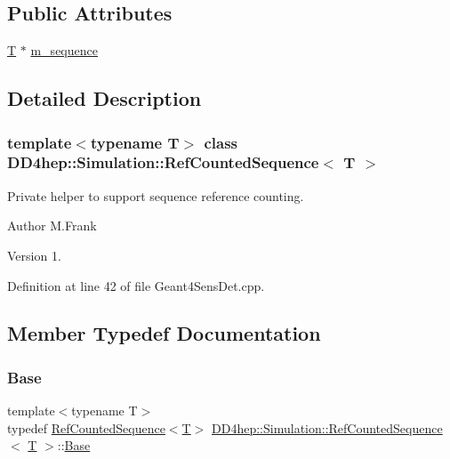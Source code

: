 \subsection*{Public Attributes}
\begin{DoxyCompactItemize}
\item 
\hyperlink{class_t}{T} $\ast$ \hyperlink{class_d_d4hep_1_1_simulation_1_1_ref_counted_sequence_a8fb29db1af39af7f025ed8d1b20b6dfe}{m\+\_\+sequence}
\end{DoxyCompactItemize}


\subsection{Detailed Description}
\subsubsection*{template$<$typename T$>$\newline
class D\+D4hep\+::\+Simulation\+::\+Ref\+Counted\+Sequence$<$ T $>$}

Private helper to support sequence reference counting. 

\begin{DoxyAuthor}{Author}
M.\+Frank 
\end{DoxyAuthor}
\begin{DoxyVersion}{Version}
1. 
\end{DoxyVersion}


Definition at line 42 of file Geant4\+Sens\+Det.\+cpp.



\subsection{Member Typedef Documentation}
\hypertarget{class_d_d4hep_1_1_simulation_1_1_ref_counted_sequence_a04dc466201b2e556a020b1282313876c}{}\label{class_d_d4hep_1_1_simulation_1_1_ref_counted_sequence_a04dc466201b2e556a020b1282313876c} 
\subsubsection{\texorpdfstring{Base}{Base}}
{\footnotesize\ttfamily template$<$typename T$>$ \\
typedef \hyperlink{class_d_d4hep_1_1_simulation_1_1_ref_counted_sequence}{Ref\+Counted\+Sequence}$<$\hyperlink{class_t}{T}$>$ \hyperlink{class_d_d4hep_1_1_simulation_1_1_ref_counted_sequence}{D\+D4hep\+::\+Simulation\+::\+Ref\+Counted\+Sequence}$<$ \hyperlink{class_t}{T} $>$\+::\hyperlink{class_d_d4hep_1_1_simulation_1_1_ref_counted_sequence_a04dc466201b2e556a020b1282313876c}{Base}}



